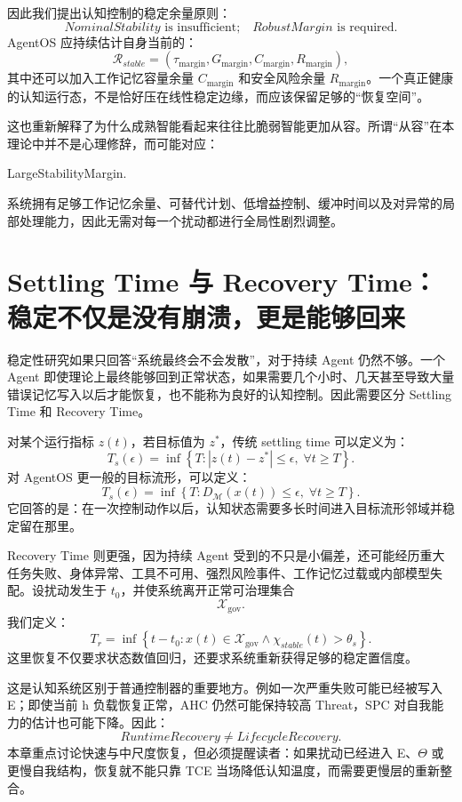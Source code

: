 因此我们提出认知控制的稳定余量原则：
\[
\boxed{
NominalStability
\text{ is insufficient;}
\quad
RobustMargin
\text{ is required.}
}
\]
AgentOS 应持续估计自身当前的：
\[
\mathcal R_{stable}
=
\left(
\tau_{\mathrm{margin}},
G_{\mathrm{margin}},
C_{\mathrm{margin}},
R_{\mathrm{margin}}
\right),
\]
其中还可以加入工作记忆容量余量 $C_{\mathrm{margin}}$ 和安全风险余量 $R_{\mathrm{margin}}$。一个真正健康的认知运行态，不是恰好压在线性稳定边缘，而应该保留足够的“恢复空间”。

这也重新解释了为什么成熟智能看起来往往比脆弱智能更加从容。所谓“从容”在本理论中并不是心理修辞，而可能对应：
\begin{statementbox}
LargeStabilityMargin.
\end{statementbox}
系统拥有足够工作记忆余量、可替代计划、低增益控制、缓冲时间以及对异常的局部处理能力，因此无需对每一个扰动都进行全局性剧烈调整。

\section{Settling Time 与 Recovery Time：稳定不仅是没有崩溃，更是能够回来}

稳定性研究如果只回答“系统最终会不会发散”，对于持续 Agent 仍然不够。一个 Agent 即使理论上最终能够回到正常状态，如果需要几个小时、几天甚至导致大量错误记忆写入以后才能恢复，也不能称为良好的认知控制。因此需要区分 Settling Time 和 Recovery Time。

对某个运行指标 $z(t)$，若目标值为 $z^{*}$，传统 settling time 可以定义为：
\[
T_s(\epsilon)
=
\inf
\left\{
T:
|z(t)-z^{*}|
\le
\epsilon,
\;\forall t\ge T
\right\}.
\]
对 AgentOS 更一般的目标流形，可以定义：
\[
T_s(\epsilon)
=
\inf
\left\{
T:
D_{\mathcal M}(x(t))
\le
\epsilon,
\;\forall t\ge T
\right\}.
\]
它回答的是：在一次控制动作以后，认知状态需要多长时间进入目标流形邻域并稳定留在那里。

Recovery Time 则更强，因为持续 Agent 受到的不只是小偏差，还可能经历重大任务失败、身体异常、工具不可用、强烈风险事件、工作记忆过载或内部模型失配。设扰动发生于 $t_0$，并使系统离开正常可治理集合
\[
\mathcal X_{\mathrm{gov}}.
\]
我们定义：
\[
T_r
=
\inf
\left\{
t-t_0:
x(t)\in
\mathcal X_{\mathrm{gov}}
\land
\chi_{stable}(t)>\theta_s
\right\}.
\]
这里恢复不仅要求状态数值回归，还要求系统重新获得足够的稳定置信度。

这是认知系统区别于普通控制器的重要地方。例如一次严重失败可能已经被写入 E；即使当前 h 负载恢复正常，AHC 仍然可能保持较高 Threat，SPC 对自我能力的估计也可能下降。因此：
\[
RuntimeRecovery
\neq
LifecycleRecovery.
\]
本章重点讨论快速与中尺度恢复，但必须提醒读者：如果扰动已经进入 E、$\Theta$ 或更慢自我结构，恢复就不能只靠 TCE 当场降低认知温度，而需要更慢层的重新整合。

